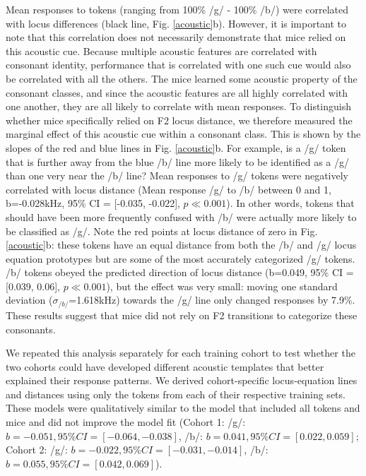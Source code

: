 Mean responses to tokens (ranging from 100\% /g/ - 100\% /b/) were correlated with locus differences (black line, Fig. \ref{acoustic}b). However, it is important to note that this correlation does not necessarily demonstrate that mice relied on this acoustic cue. Because multiple acoustic features are correlated with consonant identity, performance that is correlated with one such cue would also be correlated with all the others.
The mice learned some acoustic property of the consonant classes, and since the acoustic features are all highly correlated with one another, they are all likely to correlate with mean responses.
To distinguish whether mice specifically relied on F2 locus distance, we therefore measured the marginal effect of this acoustic cue within a consonant class. This is shown by the slopes of the red and blue lines in Fig. \ref{acoustic}b. For example, is a /g/ token that is further away from the blue /b/ line more likely to be identified as a /g/ than one very near the /b/ line? Mean responses to /g/ tokens were negatively correlated with locus distance (Mean response /g/ to /b/ between 0 and 1, b=-0.028kHz, 95\% CI = [-0.035, -0.022], $p \ll 0.001$). In other words, tokens that should have been more frequently confused with /b/ were actually more likely to be classified as /g/. Note the red points at locus distance of zero in Fig. \ref{acoustic}b: these tokens have an equal distance from both the /b/ and /g/ locus equation prototypes but are some of the most accurately categorized /g/ tokens. /b/ tokens obeyed the predicted direction of locus distance (b=0.049, 95\% CI = [0.039, 0.06], $p \ll 0.001$), but the effect was very small: moving one standard deviation ($\sigma_{/b/}$=1.618kHz) towards the /g/ line only changed responses by 7.9\%. These results suggest that mice did not rely on F2 transitions to categorize these consonants.

We repeated this analysis separately for each training cohort to test whether the two cohorts could have developed different acoustic templates that better explained their response patterns. We derived cohort-specific locus-equation lines and distances using only the tokens from each of their respective training sets. These models were qualitatively similar to the model that included all tokens and mice and did not improve the model fit (Cohort 1: /g/: $b=-0.051, 95\% CI = [-0.064, -0.038]$, /b/: $b=0.041, 95\% CI = [0.022, 0.059]$; Cohort 2: /g/: $b=-0.022, 95\% CI = [-0.031, -0.014]$, /b/: $b=0.055, 95\% CI = [0.042, 0.069]$).

